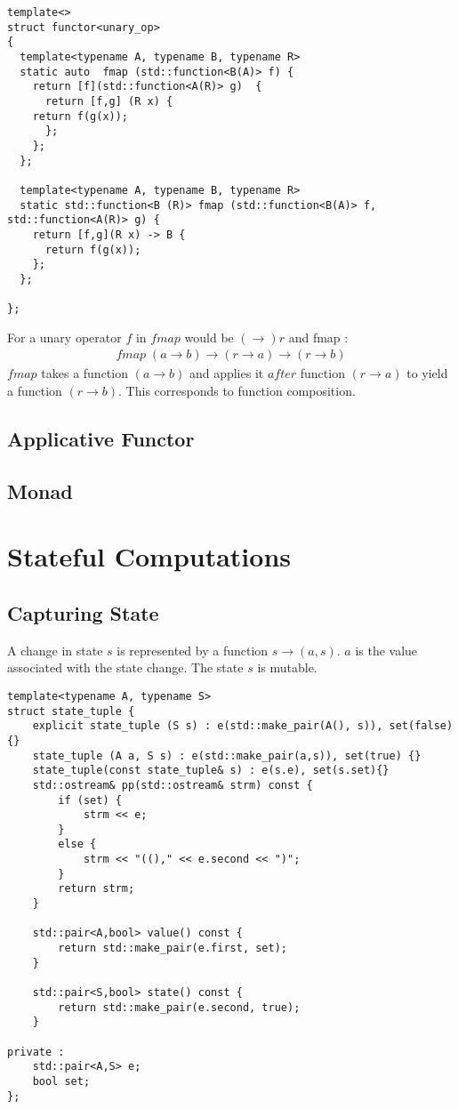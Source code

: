 \documentclass[12pt,fleqn]{article}
\begin{document}
\begin{lstlisting}[caption=functor for unary operators, label=funop]
template<>
struct functor<unary_op>
{
  template<typename A, typename B, typename R>
  static auto  fmap (std::function<B(A)> f) {  
    return [f](std::function<A(R)> g)  {
      return [f,g] (R x) {
	return f(g(x));
      };
    };
  };

  template<typename A, typename B, typename R>
  static std::function<B (R)> fmap (std::function<B(A)> f, std::function<A(R)> g) {  
    return [f,g](R x) -> B {
      return f(g(x));
    };
  };

};
\end{lstlisting}

For a unary operator $f$ in $fmap$  would be $(\rightarrow) r$ and fmap :
\begin{eqnarray*}
fmap \; (a \rightarrow b) \rightarrow (r \rightarrow a) \rightarrow (r \rightarrow b)
\end{eqnarray*}
$fmap$ takes a function $(a\rightarrow b)$ and applies it $after$ function $(r \rightarrow a)$ to yield a function $(r \rightarrow b)$.
This corresponds to function composition.

%
%
\subsection{Applicative Functor}
%
%


\subsection{Monad}






\section{Stateful Computations}


\subsection{Capturing State}
A change in state $s$ is represented by a function $s \rightarrow (a,s)$. 
$a$ is the value associated with the state change.
The state $s$ is mutable.

\begin{lstlisting}[caption=state tuple, label=state_tuple]
template<typename A, typename S>
struct state_tuple {
	explicit state_tuple (S s) : e(std::make_pair(A(), s)), set(false){}
	state_tuple (A a, S s) : e(std::make_pair(a,s)), set(true) {}
	state_tuple(const state_tuple& s) : e(s.e), set(s.set){}
	std::ostream& pp(std::ostream& strm) const {
		if (set) {
			strm << e;
		}
		else {
			strm << "(()," << e.second << ")";
		}
		return strm;
	}

	std::pair<A,bool> value() const {
		return std::make_pair(e.first, set);
	}

	std::pair<S,bool> state() const {
		return std::make_pair(e.second, true);
	}

private :	
	std::pair<A,S> e;
	bool set;
};
\end{lstlisting}
\end{document}
